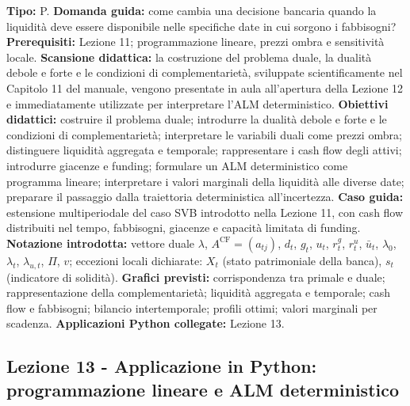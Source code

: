 \documentclass[12pt,a4paper]{article}%
\newcommand{\1}{\mathbf{1}}
\begin{document}
\textbf{Tipo:} P.\newline
\textbf{Domanda guida:} come cambia una decisione bancaria quando la
liquidit\`{a} deve essere disponibile nelle specifiche date in cui sorgono i
fabbisogni?\newline
\textbf{Prerequisiti:} Lezione 11; programmazione lineare, prezzi ombra e
sensitivit\`{a} locale.\newline
\textbf{Scansione didattica:} la costruzione del problema duale, la dualit\`{a}
debole e forte e le condizioni di complementariet\`{a}, sviluppate
scientificamente nel Capitolo 11 del manuale, vengono presentate in aula
all'apertura della Lezione 12 e immediatamente utilizzate per interpretare
l'ALM deterministico.\newline
\textbf{Obiettivi didattici:} costruire il problema duale; introdurre la
dualit\`{a} debole e forte e le condizioni di complementariet\`{a};
interpretare le variabili duali come prezzi ombra; distinguere liquidit\`{a}
aggregata e temporale; rappresentare i cash flow degli attivi; introdurre
giacenze e funding; formulare un ALM deterministico come programma lineare;
interpretare i valori marginali della liquidit\`{a} alle diverse date;
preparare il passaggio dalla traiettoria deterministica all'incertezza.\newline
\textbf{Caso guida:} estensione multiperiodale del caso SVB introdotto nella
Lezione 11, con cash flow distribuiti nel tempo, fabbisogni, giacenze e
capacit\`a limitata di funding.\newline
\textbf{Notazione introdotta:} vettore duale $\lambda$,
$A^{\mathrm{CF}}=(a_{tj})$, $d_t$, $g_t$, $u_t$, $r_t^{g}$, $r_t^{u}$,
$\bar u_t$, $\lambda_0$, $\lambda_t$, $\lambda_{u,t}$, $\Pi$, $v$;
eccezioni locali dichiarate: $X_t$ (stato patrimoniale della banca), $s_t$
(indicatore di solidit\`{a}).\newline
\textbf{Grafici previsti:} corrispondenza tra primale e duale;
rappresentazione della complementariet\`{a}; liquidit\`{a} aggregata e
temporale; cash flow e fabbisogni; bilancio intertemporale; profili ottimi;
valori marginali per scadenza.\newline
\textbf{Applicazioni Python collegate:} Lezione 13.

\subsection{Lezione 13 - Applicazione in Python: programmazione lineare
e ALM deterministico}
\end{document}
